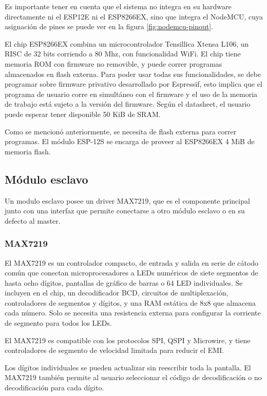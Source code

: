 Es importante tener en cuenta que el sistema no integra en su hardware directamente ni el ESP12E ni el ESP8266EX, sino que integra el NodeMCU, cuya asignación de pines se puede ver en la figura \ref{fig:nodemcu-pinout}.

El chip ESP8266EX combina un microcontrolador Tensillica Xtensa L106, un RISC de 32 bits corriendo a 80 Mhz, con funcionalidad WiFi. \cite{ESP8266Datasheet} El chip tiene memoria ROM con firmware no removible, y puede correr programas almacenados en flash externa. Para poder usar todas sus funcionalidades, se debe programar sobre firmware privativo desarrollado por Espressif, esto implica que el programa de usuario corre en simultáneo con el firmware y el uso de la memoria de trabajo está sujeto a la versión del firmware. Según el datasheet, el usuario puede esperar tener disponible 50 KiB de SRAM.

Como se mencionó anteriormente, se necesita de flash externa para correr programas. El módulo ESP-12S se encarga de proveer al ESP8266EX 4 MiB de memoria flash.

\subsection{Módulo esclavo}
Un modulo esclavo posee un driver MAX7219, que es el componente principal junto con una interfaz que permite conectarse a otro módulo esclavo o en su defecto al master.

\subsubsection{MAX7219}
El MAX7219 es un controlador compacto, de entrada y salida en serie de cátodo común que conectan microprocesadores a LEDs numéricos de siete segmentos de hasta ocho dígitos, pantallas de gráfico de barras o 64 LED individuales. Se incluyen en el chip, un decodificador BCD, circuitos de multiplexación, controladores de segmentos y dígitos, y una RAM estática de 8x8 que almacena cada número. Solo se necesita una resistencia externa para configurar la corriente de segmento para todos los LEDs.

El MAX7219 es compatible con los protocolos SPI, QSPI y Microwire, y tiene controladores de segmento de velocidad limitada para reducir el EMI.

Los dígitos individuales se pueden actualizar sin reescribir toda la pantalla. El MAX7219 también permite al usuario seleccionar el código de decodificación o no decodificación para cada dígito.

